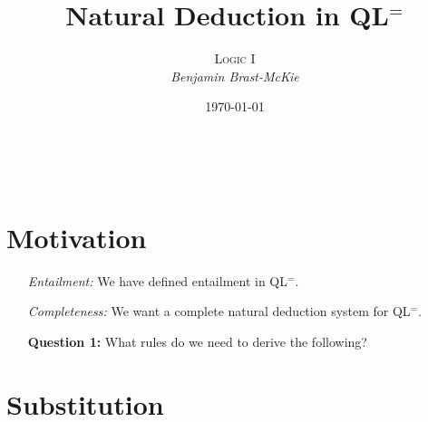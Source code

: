\documentclass[a4paper, 11pt]{article} %
\title{\textbf{Natural Deduction in QL$^=$}} %
\author{\textsc{Logic I}\\ \em Benjamin Brast-McKie} %
\date{\today} %
\makeatletter
\def\therefore{\ensuremath{\ldotp\dot\,\ldotp}}
\renewcommand{\maketitle}{ %
\begin{flushright} %
{\LARGE\@title} %

\vspace{10pt} %

{\@author} %
\\\@date %

\vspace{20pt} %
\end{flushright}
}
\makeatother
\begin{document}
\maketitle %

\thispagestyle{empty}




\section*{Motivation}

\begin{enumerate}
  \item[\it Entailment:] We have defined entailment in QL$^=$.
  \item[\it Completeness:] We want a complete natural deduction system for QL$^=$.
  \item[\bf Question 1:] What rules do we need to derive the following?
    \begin{itemize}
    \end{itemize}
\end{enumerate}




\section*{Substitution}
\end{document}
